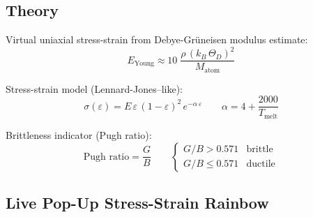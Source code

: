 \documentclass[11pt,a4paper]{article}
\begin{document}
\subsection{Theory}

Virtual uniaxial stress-strain from Debye-Gr\"uneisen modulus estimate:
\begin{equation}
  E_{\text{Young}} \approx 10\;\frac{\rho\,(k_{B}\,\Theta_{D})^{2}}{M_{\text{atom}}}
  \label{eq:young}
\end{equation}

Stress-strain model (Lennard-Jones--like):
\begin{equation}
  \sigma(\varepsilon) = E\,\varepsilon\,(1 - \varepsilon)^{2}\,
  e^{-\alpha\,\varepsilon}
  \qquad
  \alpha = 4 + \frac{2000}{T_{\text{melt}}}
  \label{eq:stressstrain}
\end{equation}

Brittleness indicator (Pugh ratio):
\begin{equation}
  \text{Pugh ratio} = \frac{G}{B}
  \qquad
  \begin{cases}
    G/B > 0.571 & \text{brittle} \\
    G/B \leq 0.571 & \text{ductile}
  \end{cases}
\end{equation}

\subsection{Live Pop-Up Stress-Strain Rainbow}
\end{document}
